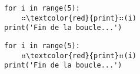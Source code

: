 \documentclass{article}
\begin{document}
\lstset{escapechar=\⠶}  %
\lstset{language=Python}
\begin{lstlisting}
for i in range(5):
    ⠶\textcolor{red}{print}⠶(i)
print('Fin de la boucle...')
\end{lstlisting}

\begin{lstlisting}
for i in range(5):
    ⠶\textcolor{red}{print}⠶(i)
print('Fin de la boucle...')
\end{lstlisting}
\end{document}
